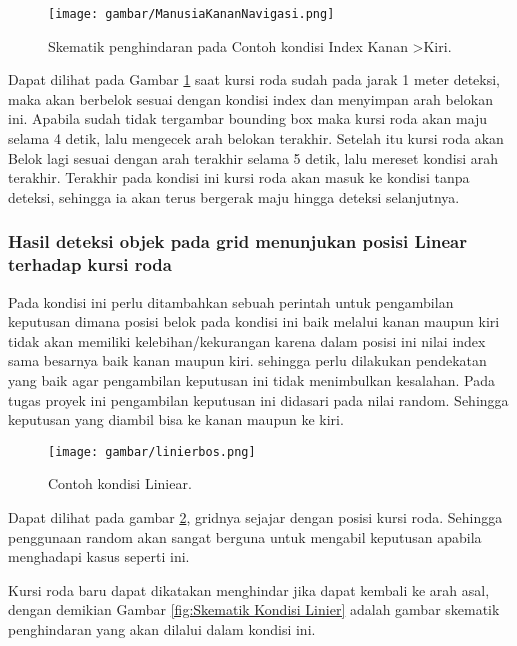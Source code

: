\begin{figure}[H]
  \centering
  \texttt{[image: gambar/ManusiaKananNavigasi.png]}
  \caption{Skematik penghindaran pada Contoh kondisi Index Kanan \textgreater Kiri.}
  \label{fig:Skematik Kondisi Index Kanan>Kiri}
\end{figure}

Dapat dilihat pada Gambar \ref{fig:Skematik Kondisi Index Kanan>Kiri} saat kursi roda sudah pada jarak 1 meter deteksi, maka akan berbelok sesuai dengan kondisi index dan menyimpan arah belokan ini. Apabila sudah tidak tergambar bounding box maka kursi roda akan maju selama 4 detik, lalu mengecek arah belokan terakhir. Setelah itu kursi roda akan Belok lagi sesuai dengan arah terakhir selama 5 detik, lalu mereset kondisi arah terakhir. Terakhir pada kondisi ini kursi roda akan masuk ke kondisi tanpa deteksi, sehingga ia akan terus bergerak maju hingga deteksi selanjutnya.

\subsubsection{Hasil deteksi objek pada grid menunjukan posisi Linear terhadap
kursi roda}

Pada kondisi ini perlu ditambahkan sebuah perintah untuk pengambilan keputusan dimana posisi belok pada kondisi ini baik melalui kanan maupun kiri tidak akan memiliki kelebihan/kekurangan karena dalam posisi ini nilai index sama besarnya baik kanan maupun kiri. sehingga perlu dilakukan pendekatan yang baik agar pengambilan keputusan ini tidak menimbulkan kesalahan. Pada tugas proyek ini pengambilan keputusan ini didasari pada nilai random. Sehingga keputusan yang diambil bisa ke kanan maupun ke kiri. 

\begin{figure}[H]
    \centering
    \texttt{[image: gambar/linierbos.png]}
    \caption{Contoh kondisi Liniear.}
    \label{fig:Kondisi Linear}
\end{figure}

Dapat dilihat pada gambar \ref{fig:Kondisi Linear}, gridnya sejajar dengan posisi kursi roda. Sehingga penggunaan random akan sangat berguna untuk mengabil keputusan apabila menghadapi kasus seperti ini.

Kursi roda baru dapat dikatakan menghindar jika dapat kembali ke arah asal, dengan demikian Gambar \ref{fig:Skematik Kondisi Linier} adalah gambar skematik penghindaran yang akan dilalui dalam kondisi ini.


